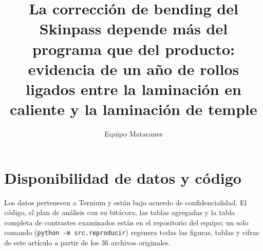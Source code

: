 \documentclass[5p,times,twocolumn]{elsarticle}
\begin{document}
\begin{frontmatter}

\title{La corrección de bending del Skinpass depende más del programa que del producto: evidencia de un año
de rollos ligados entre la laminación en caliente y la laminación de temple}

\author{Equipo Matacanes}



\end{frontmatter}








\section*{Disponibilidad de datos y código}
Los datos pertenecen a Ternium y están bajo acuerdo de confidencialidad. El código, el plan de análisis con su
bitácora, las tablas agregadas y la tabla completa de \NContrastes{} contrastes examinados están en el repositorio
del equipo; un solo comando (\texttt{python -m src.reproducir}) regenera todas las figuras, tablas y cifras de este
artículo a partir de los 36 archivos originales.




\onecolumn
\appendix

\end{document}
